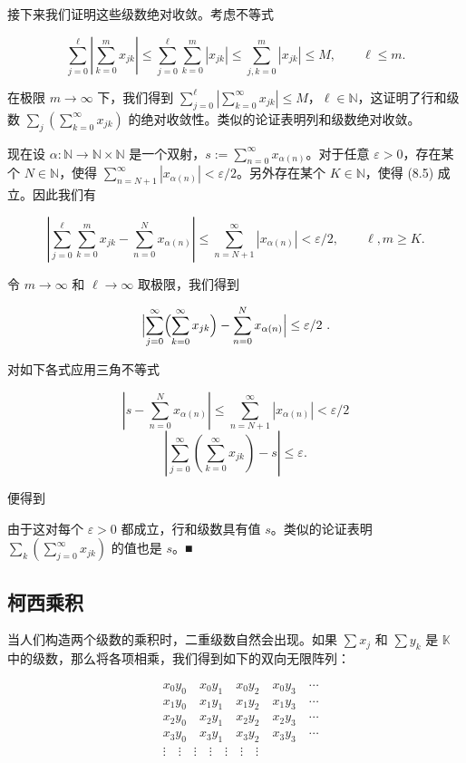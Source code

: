 \begin{theorem}
接下来我们证明这些级数绝对收敛。考虑不等式

\[
\sum_{j=0}^{\ell}\left|\sum_{k=0}^{m}x_{jk}\right|\leq\sum_{j=0}^{\ell}\sum_{k=0}^{m}\left|x_{jk}\right|\leq\sum_{j,k=0}^{m}\left|x_{jk}\right|\leq M,\qquad\ell\leq m.
\]

在极限 $ m \to \infty $ 下，我们得到 $ \sum_{j=0}^{\ell} \left| \sum_{k=0}^{\infty} x_{jk} \right| \leq M $，$ \ell \in \mathbb{N} $，这证明了行和级数 $ \sum_{j} \left( \sum_{k=0}^{\infty} x_{jk} \right) $ 的绝对收敛性。类似的论证表明列和级数绝对收敛。

现在设 $\alpha: \mathbb{N} \to \mathbb{N} \times \mathbb{N}$ 是一个双射，$s := \sum_{n=0}^{\infty} x_{\alpha(n)}$。对于任意 $\varepsilon > 0$，存在某个 $N \in \mathbb{N}$，使得 $\sum_{n=N+1}^{\infty} |x_{\alpha(n)}| < \varepsilon/2$。另外存在某个 $K \in \mathbb{N}$，使得 (8.5) 成立。因此我们有

\[
\left|\sum_{j=0}^{\ell}\sum_{k=0}^{m}x_{j k}-\sum_{n=0}^{N}x_{\alpha(n)}\right|\leq\sum_{n=N+1}^{\infty}\left|x_{\alpha(n)}\right|<\varepsilon/2,\qquad\ell,m\geq K.
\]

令 $ m \to \infty $ 和 $ \ell \to \infty $ 取极限，我们得到

\[
\Bigl|\sum_{j=0}^{\infty}\Bigl(\sum_{k=0}^{\infty}x_{j k}\Bigr)-\sum_{n=0}^{N}x_{\alpha(n)}\Bigr|\leq\varepsilon/2~.
\]

对如下各式应用三角不等式

\[
\left|s-\sum_{n=0}^{N}x_{\alpha(n)}\right|\leq\sum_{n=N+1}^{\infty}\left|x_{\alpha(n)}\right|<\varepsilon/2
\]
\[
\left|\sum_{j=0}^{\infty}\left(\sum_{k=0}^{\infty}x_{j k}\right)-s\right|\leq\varepsilon.
\]

便得到

由于这对每个 $\varepsilon > 0$ 都成立，行和级数具有值 $s$。类似的论证表明 $\sum_{k}\left(\sum_{j=0}^{\infty}x_{jk}\right)$ 的值也是 $s$。■

\end{theorem}

\subsection*{柯西乘积}

当人们构造两个级数的乘积时，二重级数自然会出现。如果 $ \sum x_j $ 和 $ \sum y_k $ 是 $ \mathbb{K} $ 中的级数，那么将各项相乘，我们得到如下的双向无限阵列：

\begin{equation}
\begin{aligned}
&x_{0}y_{0}\quad x_{0}y_{1}\quad x_{0}y_{2}\quad x_{0}y_{3}\quad\cdots\\&x_{1}y_{0}\quad x_{1}y_{1}\quad x_{1}y_{2}\quad x_{1}y_{3}\quad\cdots\\&x_{2}y_{0}\quad x_{2}y_{1}\quad x_{2}y_{2}\quad x_{2}y_{3}\quad\cdots\\&x_{3}y_{0}\quad x_{3}y_{1}\quad x_{3}y_{2}\quad x_{3}y_{3}\quad\cdots\\&\vdots\quad\vdots\quad\vdots\quad\vdots\quad\vdots\quad\vdots\quad\vdots\\
\end{aligned}
\end{equation}

